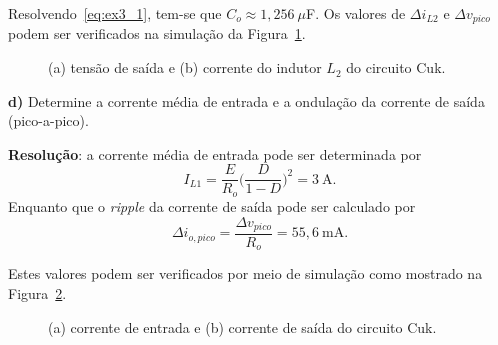 Resolvendo~\eqref{eq:ex3_1}, tem-se que $C_o \approx 1{,}256~\mu$F. Os valores de $\Delta i_{L2}$ e $\Delta v_{pico}$ podem ser verificados na simulação da Figura~\ref{fig:ex3_2}.
\begin{figure}[htb!]
	\centering
	
	\caption{(a) tensão de saída e (b) corrente do indutor $L_2$ do circuito Cuk.}
	\label{fig:ex3_2}
\end{figure}

\medskip
\textbf{d)} Determine a corrente média de entrada e a ondulação da corrente de saída (pico-a-pico).

\medskip
\textbf{Resolução}: a corrente média de entrada pode ser determinada por
\begin{equation*}
	I_{L1} = \frac{E}{R_o}\big(\frac{D}{1 - D}\big)^2 = 3~\mathrm{A}.
\end{equation*}
Enquanto que o \textit{ripple} da corrente de saída pode ser calculado por
\begin{equation*}
	\Delta i_{o,pico} = \frac{\Delta v_{pico}}{R_o} = 55{,}6~\mathrm{mA}.
\end{equation*}

Estes valores podem ser verificados por meio de simulação como mostrado na Figura~\ref{fig:ex3_3}.
\begin{figure}[htb!]
	\centering
	
	\caption{(a) corrente de entrada e (b) corrente de saída do circuito Cuk.}
	\label{fig:ex3_3}
\end{figure}
